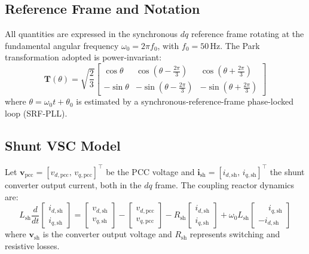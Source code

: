 \documentclass[conference]{IEEEtran}
\begin{document}
\subsection{Reference Frame and Notation}

All quantities are expressed in the synchronous $dq$ reference frame
rotating at the fundamental angular frequency $\omega_0 = 2\pi f_0$,
with $f_0 = 50$\,Hz.
The Park transformation adopted is power-invariant:
\begin{equation}
  \bm{T}(\theta) =
  \sqrt{\frac{2}{3}}
  \begin{bmatrix}
    \cos\theta & \cos\!\left(\theta - \tfrac{2\pi}{3}\right)
              & \cos\!\left(\theta + \tfrac{2\pi}{3}\right) \\[4pt]
    -\sin\theta & -\sin\!\left(\theta - \tfrac{2\pi}{3}\right)
               & -\sin\!\left(\theta + \tfrac{2\pi}{3}\right)
  \end{bmatrix}
  \label{eq:park}
\end{equation}
where $\theta = \omega_0 t + \theta_0$ is estimated by a
synchronous-reference-frame phase-locked loop (SRF-PLL).

\subsection{Shunt VSC Model}

Let $\bm{v}_\text{pcc} = [v_{d,\text{pcc}},\, v_{q,\text{pcc}}]^\top$
be the PCC voltage and $\bm{i}_\text{sh} = [i_{d,\text{sh}},\, i_{q,\text{sh}}]^\top$
the shunt converter output current, both in the $dq$ frame.
The coupling reactor dynamics are:
\begin{equation}
  L_\text{sh}\frac{d}{dt}
  \begin{bmatrix} i_{d,\text{sh}} \\ i_{q,\text{sh}} \end{bmatrix}
  =
  \begin{bmatrix} v_{d,\text{sh}} \\ v_{q,\text{sh}} \end{bmatrix}
  -
  \begin{bmatrix} v_{d,\text{pcc}} \\ v_{q,\text{pcc}} \end{bmatrix}
  -
  R_\text{sh}
  \begin{bmatrix} i_{d,\text{sh}} \\ i_{q,\text{sh}} \end{bmatrix}
  +
  \omega_0 L_\text{sh}
  \begin{bmatrix} \phantom{-}i_{q,\text{sh}} \\ -i_{d,\text{sh}} \end{bmatrix}
  \label{eq:shunt_dq}
\end{equation}
where $\bm{v}_\text{sh}$ is the converter output voltage and
$R_\text{sh}$ represents switching and resistive losses.
\end{document}
